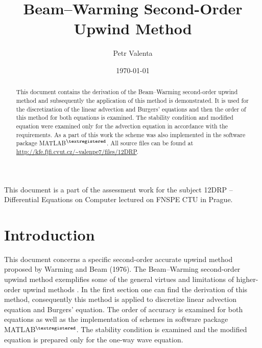 \documentclass[a4paper, 10pt]{article}
\title{Beam--Warming Second-Order Upwind Method}
\author{Petr Valenta}
\date{\today}
\begin{document}
\maketitle
{\small This document is a part of the assessment work for the subject 12DRP -- Differential Equations on Computer lectured on FNSPE CTU in Prague.}
\begin{abstract}
This document contains the derivation of the Beam--Warming second-order upwind method and subsequently the application of this method is demonstrated. It is used for the discretization of the linear advection and Burgers' equations and then the order of this method for both equations is examined. The stability condition and modified equation were examined only for the advection equation in accordance with the requirements. As a part of this work the scheme was also implemented in the software package MATLAB${\tiny ^{\textregistered}}$. All source files can be found at \mbox{\url{http://kfe.fjfi.cvut.cz/~valenpe7/files/12DRP}.}
\end{abstract}

\tableofcontents

\section{Introduction}
This document concerns a specific second-order accurate upwind method proposed by Warming and Beam (1976). The Beam--Warming second-order upwind method exemplifies some of the general virtues and limitations of higher-order upwind methods \cite{laney}. In the first section one can find the derivation of this method, consequently this method is applied to discretize linear advection equation and Burgers' equation. The order of accuracy is examined for both equations as well as the implementation of schemes in software package MATLAB${\tiny ^{\textregistered}}$. The stability condition is examined and the modified equation is prepared only for the one-way wave equation. 
\end{document}
